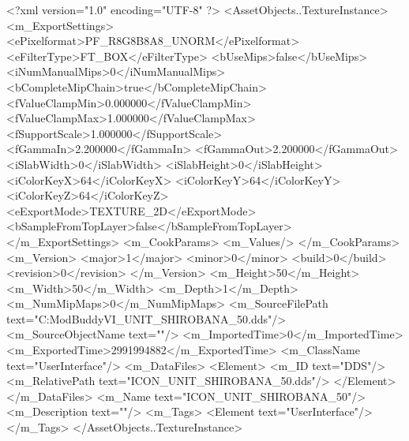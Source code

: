<?xml version="1.0" encoding="UTF-8" ?>
<AssetObjects..TextureInstance>
	<m_ExportSettings>
		<ePixelformat>PF_R8G8B8A8_UNORM</ePixelformat>
		<eFilterType>FT_BOX</eFilterType>
		<bUseMips>false</bUseMips>
		<iNumManualMips>0</iNumManualMips>
		<bCompleteMipChain>true</bCompleteMipChain>
		<fValueClampMin>0.000000</fValueClampMin>
		<fValueClampMax>1.000000</fValueClampMax>
		<fSupportScale>1.000000</fSupportScale>
		<fGammaIn>2.200000</fGammaIn>
		<fGammaOut>2.200000</fGammaOut>
		<iSlabWidth>0</iSlabWidth>
		<iSlabHeight>0</iSlabHeight>
		<iColorKeyX>64</iColorKeyX>
		<iColorKeyY>64</iColorKeyY>
		<iColorKeyZ>64</iColorKeyZ>
		<eExportMode>TEXTURE_2D</eExportMode>
		<bSampleFromTopLayer>false</bSampleFromTopLayer>
	</m_ExportSettings>
	<m_CookParams>
		<m_Values/>
	</m_CookParams>
	<m_Version>
		<major>1</major>
		<minor>0</minor>
		<build>0</build>
		<revision>0</revision>
	</m_Version>
	<m_Height>50</m_Height>
	<m_Width>50</m_Width>
	<m_Depth>1</m_Depth>
	<m_NumMipMaps>0</m_NumMipMaps>
	<m_SourceFilePath text="C:\Users\asus\Documents\Firaxis ModBuddy\Civilization VI\temppic\ICON_UNIT_SHIROBANA_50.dds"/>
	<m_SourceObjectName text=""/>
	<m_ImportedTime>0</m_ImportedTime>
	<m_ExportedTime>2991994882</m_ExportedTime>
	<m_ClassName text="UserInterface"/>
	<m_DataFiles>
		<Element>
			<m_ID text="DDS"/>
			<m_RelativePath text="ICON_UNIT_SHIROBANA_50.dds"/>
		</Element>
	</m_DataFiles>
	<m_Name text="ICON_UNIT_SHIROBANA_50"/>
	<m_Description text=""/>
	<m_Tags>
		<Element text="UserInterface"/>
	</m_Tags>
</AssetObjects..TextureInstance>


